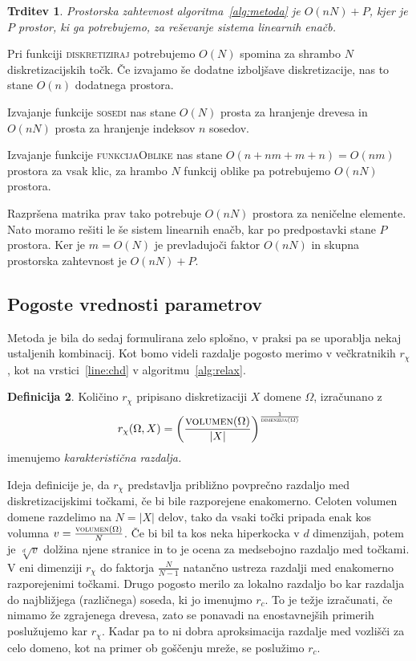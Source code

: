 \documentclass[12pt,a4paper]{article}
\theoremstyle{definition} %
\newtheorem{definicija}{Definicija}[section]
\theoremstyle{plain} %
\newtheorem{trditev}[definicija]{Trditev}
\numberwithin{equation}{section}
\begin{document}
\begin{trditev}
  Prostorska zahtevnost algoritma~\ref{alg:metoda} je $O(nN) + P$, kjer je $P$
  prostor, ki ga potrebujemo, za reševanje sistema linearnih enačb.
\end{trditev}
\proof
Pri funkciji \textsc{diskretiziraj} potrebujemo $O(N)$ spomina za shrambo $N$
diskretizacijskih točk. Če izvajamo še dodatne izboljšave diskretizacije, nas to
stane $O(n)$ dodatnega prostora.

Izvajanje funkcije \textsc{sosedi} nas stane $O(N)$ prosta za hranjenje drevesa
in $O(nN)$ prosta za hranjenje indeksov $n$ sosedov.

Izvajanje funkcije \textsc{funkcijaOblike} nas stane $O(n+nm+m+n) = O(nm)$
prostora za vsak klic, za hrambo $N$ funkcij oblike pa potrebujemo $O(nN)$
prostora.

Razpršena matrika prav tako potrebuje $O(nN)$ prostora za neničelne elemente.
Nato moramo rešiti le še sistem linearnih enačb, kar po predpostavki stane $P$
prostora. Ker je $m = O(N)$ je prevladujoči faktor $O(nN)$ in skupna prostorska
zahtevnost je $O(nN) + P$.
\endproof

\subsection{Pogoste vrednosti parametrov}
Metoda je bila do sedaj formulirana zelo splošno, v praksi pa se uporablja nekaj
ustaljenih kombinacij. Kot bomo videli razdalje pogosto merimo v večkratnikih
$r_\chi$, kot na vrstici~\ref{line:chd} v algoritmu~\ref{alg:relax}.
\begin{definicija}
  Količino $r_\chi$ pripisano diskretizaciji $X$ domene $\Omega$, izračunano z \[
    r_\chi(\Omega, X) = \left( \frac{\textsc{volumen}(\Omega)}{|X|}
    \right)^\frac{1}{\textsc{dimenzija}(\Omega)}
  \]
  imenujemo \emph{karakteristična razdalja.}
\end{definicija}
Ideja definicije je, da $r_\chi$ predstavlja približno povprečno razdaljo med
diskretizacijskimi točkami, če bi bile razporejene enakomerno. Celoten volumen
domene razdelimo na $N = |X|$ delov, tako da vsaki točki pripada enak kos
volumna $v = \frac{\textsc{volumen}(\Omega)}{N}$. Če bi
bil ta kos neka hiperkocka v $d$ dimenzijah, potem je $\sqrt[d]{v}$ dolžina
njene stranice in to je ocena za medsebojno razdaljo med točkami.
V eni dimenziji $r_\chi$ do faktorja $\frac{N}{N-1}$ natančno ustreza razdalji
med enakomerno razporejenimi točkami.
Drugo pogosto merilo za lokalno razdaljo bo kar razdalja do najbližjega
(različnega) soseda, ki jo imenujmo $r_c$. To je težje izračunati, če nimamo že
zgrajenega drevesa, zato se ponavadi na enostavnejših primerih poslužujemo kar
$r_\chi$. Kadar pa to ni dobra aproksimacija razdalje med vozlišči za celo
domeno, kot na primer ob goščenju mreže, se poslužimo $r_c$.
\end{document}

